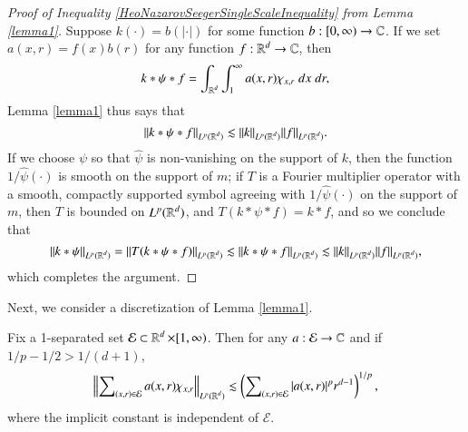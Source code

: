 \begin{proof}[Proof of Inequality \eqref{HeoNazarovSeegerSingleScaleInequality} from Lemma \ref{lemma1}] Suppose $k(\cdot) = b(|\cdot|)$ for some function $b: [0,\infty) \to \operatorname{\mathbb{C}}$. If we set $a(x,r) = f(x) b(r)$ for any function $f: \operatorname{\mathbb{R}}^d \to \operatorname{\mathbb{C}}$, then
%
\begin{equation}
  k * \psi * f = \int_{\operatorname{\mathbb{R}}^d} \int_1^\infty a(x,r) \chi_{x, r}\; dx\; dr,
\end{equation}
%
Lemma \ref{lemma1} thus says that
%
\begin{equation}
  \| k * \psi * f \|_{L^p(\operatorname{\mathbb{R}}^d)} \lesssim \| k \|_{L^p(\operatorname{\mathbb{R}}^d)} \| f \|_{L^p(\operatorname{\mathbb{R}}^d)}.
\end{equation}
%
If we choose $\psi$ so that $\widehat{\psi}$ is non-vanishing on the support of $k$, then the function $1/\widehat{\psi}(\cdot)$ is smooth on the support of $m$; if $T$ is a Fourier multiplier operator with a smooth, compactly supported symbol agreeing with $1/\widehat{\psi}(\cdot)$ on the support of $m$, then $T$ is bounded on $L^p(\operatorname{\mathbb{R}}^d)$, and $T(k * \psi * f) = k * f$, and so we conclude that
%
\begin{equation}
  \| k * \psi \|_{L^p(\operatorname{\mathbb{R}}^d)} = \| T(k * \psi * f) \|_{L^p(\operatorname{\mathbb{R}}^d)} \lesssim \| k * \psi * f \|_{L^p(\operatorname{\mathbb{R}}^d)} \lesssim \| k \|_{L^p(\operatorname{\mathbb{R}}^d)} \| f \|_{L^p(\operatorname{\mathbb{R}}^d)},
\end{equation}
%
which completes the argument.
\end{proof}

Next, we consider a discretization of Lemma \ref{lemma1}.

\begin{theorem} \label{lemma2}
    Fix a 1-separated set $\mathcal{E} \subset \operatorname{\mathbb{R}}^d \times [1,\infty)$. Then for any $a: \mathcal{E} \to \operatorname{\mathbb{C}}$ and if $1/p - 1/2 > 1/(d+1)$,
    \[ \left\| \sum\nolimits_{(x,r) \in \mathcal{E}} a(x,r) \chi_{x, r} \right\|_{L^p(\operatorname{\mathbb{R}}^d)} \lesssim \left( \sum\nolimits_{(x,r) \in \mathcal{E}} |a(x,r)|^p r^{d-1} \right)^{1/p}, \]
    where the implicit constant is independent of $\mathcal{E}$.
\end{theorem}

